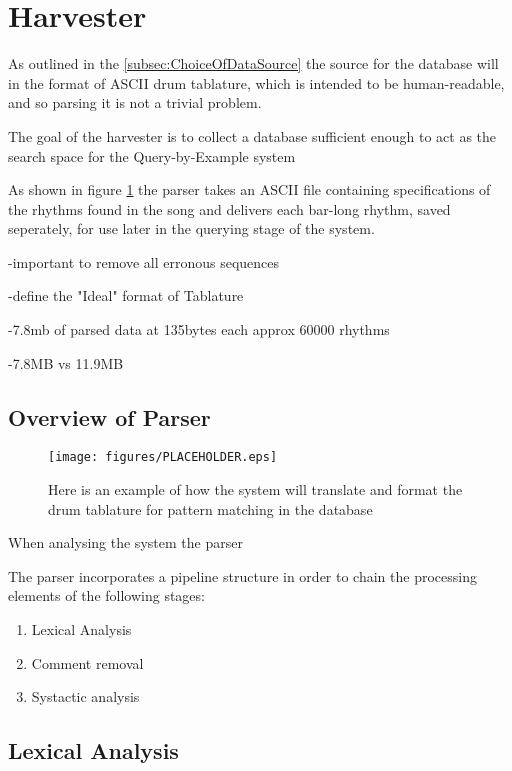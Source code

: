 \documentclass[12pt,twoside,notitlepage]{report}
\begin{document}
	\section{Harvester}
	As outlined in the \ref{subsec:ChoiceOfDataSource} the source for the database will in the format of ASCII drum tablature, which is intended to be human-readable, and so parsing it is not a trivial problem. 
	
	The goal of the harvester is to collect a database sufficient enough to act as the search space for the Query-by-Example system
	
	As shown in figure \ref{exampleIdealParse} the parser takes an ASCII file containing specifications of the rhythms found in the song and delivers each bar-long rhythm, saved seperately, for use later in the querying stage of the system.
	
	
	-important to remove all erronous sequences

	-define the "Ideal" format of Tablature

	-7.8mb of parsed data at 135bytes each approx 60000 rhythms

	-7.8MB vs 11.9MB
	
		\subsection{Overview of Parser}
\begin{figure}[h]
			\centerline{\texttt{[image: figures/PLACEHOLDER.eps]}}
			\caption{\label{exampleIdealParse} Here is an example of how the system will translate and format the drum tablature for pattern matching in the database}
\end{figure}

		When analysing the system the parser

		The parser incorporates a pipeline structure in order to chain the processing elements of the following stages:
		\begin{enumerate}
			\item{Lexical Analysis}
			\item{Comment removal}
			\item{Systactic analysis}
		\end{enumerate}
		
		

		\subsection{Lexical Analysis}
				
\end{document}
